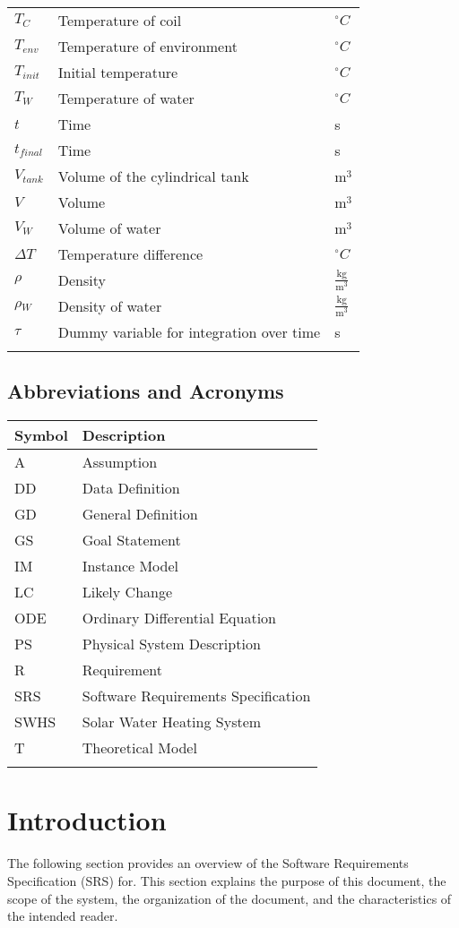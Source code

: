 \documentclass[12pt]{article}
\begin{document}
\begin{longtable*}{l l l}
$T_{C}$ & Temperature of coil & ${}^{\circ}C$
\\
$T_{env}$ & Temperature of environment & ${}^{\circ}C$
\\
$T_{init}$ & Initial temperature & ${}^{\circ}C$
\\
$T_{W}$ & Temperature of water & ${}^{\circ}C$
\\
$t$ & Time & s
\\
$t_{final}$ & Time & s
\\
$V_{tank}$ & Volume of the cylindrical tank & $\text{m}^{3}$
\\
$V$ & Volume & $\text{m}^{3}$
\\
$V_{W}$ & Volume of water & $\text{m}^{3}$
\\
$\Delta{}T$ & Temperature difference & ${}^{\circ}C$
\\
$\rho{}$ & Density & $\frac{\text{kg}}{\text{m}^{3}}$
\\
$\rho{}_{W}$ & Density of water & $\frac{\text{kg}}{\text{m}^{3}}$
\\
$\tau{}$ & Dummy variable for integration over time & s
\\
\bottomrule
\label{Table:TablofSymb}
\end{longtable*}
\subsection{Abbreviations and Acronyms}
\label{Sec:AbbrandAcro}
\begin{longtable*}{l l}
\toprule
Symbol & Description
\\
\midrule
A & Assumption
\\
DD & Data Definition
\\
GD & General Definition
\\
GS & Goal Statement
\\
IM & Instance Model
\\
LC & Likely Change
\\
ODE & Ordinary Differential Equation
\\
PS & Physical System Description
\\
R & Requirement
\\
SRS & Software Requirements Specification
\\
SWHS & Solar Water Heating System
\\
T & Theoretical Model
\\
\bottomrule
\label{Table:AbbrandAcro}
\end{longtable*}
\section{Introduction}
\label{Sec:Intr}
The following section provides an overview of the Software Requirements Specification (SRS) for. This section explains the purpose of this document, the scope of the system, the organization of the document, and the characteristics of the intended reader.
\end{document}
